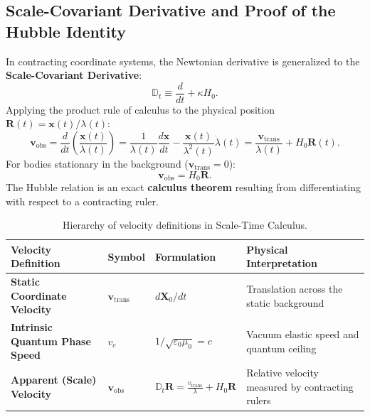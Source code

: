 \subsection{Scale-Covariant Derivative and Proof of the Hubble Identity}
In contracting coordinate systems, the Newtonian derivative is generalized to the \textbf{Scale-Covariant Derivative}:
\begin{equation}
    \mathbb{D}_t \equiv \frac{d}{dt} + \kappa H_0.
    \label{eq:olcek_turev_main}
\end{equation}
Applying the product rule of calculus to the physical position $\mathbf{R}(t) = \mathbf{x}(t)/\lambda(t)$:
\begin{equation}
    \mathbf{v}_{\mathrm{obs}} = \frac{d}{dt}\left( \frac{\mathbf{x}(t)}{\lambda(t)} \right) = \frac{1}{\lambda(t)} \frac{d\mathbf{x}}{dt} - \frac{\mathbf{x}(t)}{\lambda^2(t)} \dot{\lambda}(t) = \frac{\mathbf{v}_{\mathrm{trans}}}{\lambda(t)} + H_0 \mathbf{R}(t).
    \label{eq:hubble_turev_ispat}
\end{equation}
For bodies stationary in the background ($\mathbf{v}_{\mathrm{trans}} = 0$):
\begin{equation}
    \mathbf{v}_{\mathrm{obs}} = H_0 \mathbf{R}.
    \label{eq:hubble_dogrudan}
\end{equation}
The Hubble relation is an exact \textbf{calculus theorem} resulting from differentiating with respect to a contracting ruler.

\begin{table}[h!]
    \centering
    \small
    \begin{tabular}{@{}llll@{}}
        \toprule
        \textbf{Velocity Definition}          & \textbf{Symbol}               & \textbf{Formulation}                                                            & \textbf{Physical Interpretation}                  \\ \midrule
        \textbf{Static Coordinate Velocity}   & $\mathbf{v}_{\mathrm{trans}}$ & $d\mathbf{X}_0/dt$                                                              & Translation across the static background          \\
        \textbf{Intrinsic Quantum Phase Speed} & $v_c$                         & $1/\sqrt{\varepsilon_0\mu_0} = c$                                               & Vacuum elastic speed and quantum ceiling          \\
        \textbf{Apparent (Scale) Velocity}    & $\mathbf{v}_{\mathrm{obs}}$   & $\mathbb{D}_t \mathbf{R} = \frac{v_{\mathrm{trans}}}{\lambda} + H_0 \mathbf{R}$ & Relative velocity measured by contracting rulers  \\ \bottomrule
    \end{tabular}
    \caption{Hierarchy of velocity definitions in Scale-Time Calculus.}
    \label{tab:hiz_hiyerarsisi_main}
\end{table}

